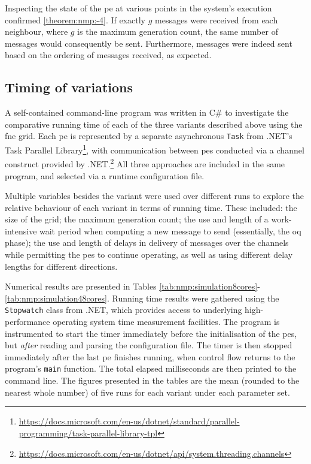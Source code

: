 Inspecting the state of the \gls{pe} at various points in the system's execution confirmed \autoref{theorem:nmp:-4}.  If exactly \(g\) messages were received from each neighbour, where \(g\) is the maximum generation count, the same number of messages would consequently be sent.  Furthermore, messages were indeed sent based on the ordering of messages received, as expected.

\subsection{\label{sec:nmp:timingexp}Timing of variations}
A self-contained command-line program was written in C\# to investigate the comparative running time of each of the three variants described above using the \gls{fne} grid.  Each \gls{pe} is represented by a separate asynchronous \texttt{Task} from .NET's Task Parallel Library{\footnote{\raggedright\url{https://docs.microsoft.com/en-us/dotnet/standard/parallel-programming/task-parallel-library-tpl}}}, with communication between \glspl{pe} conducted via a channel construct provided by .NET.\footnote{\url{https://docs.microsoft.com/en-us/dotnet/api/system.threading.channels}}  All three approaches are included in the same program, and selected via a runtime configuration file.

Multiple variables besides the variant were used over different runs to explore the relative behaviour of each variant in terms of running time.  These included:  the size of the grid; the maximum generation count;  the use and length of a work-intensive wait period when computing a new message to send (essentially, the \gls{oq} phase);  the use and length of delays in delivery of messages over the channels while permitting the \glspl{pe} to continue operating, as well as using different delay lengths for different directions.

Numerical results are presented in Tables \ref{tab:nmp:simulation8cores}-\ref{tab:nmp:simulation48cores}.  Running time results were gathered using the \texttt{Stopwatch} class from .NET, which provides access to underlying high-performance operating system time measurement facilities.  The program is instrumented to start the timer immediately before the initialisation of the \glspl{pe}, but \emph{after} reading and parsing the configuration file.  The timer is then stopped immediately after the last \gls{pe} finishes running, when control flow returns to the program's \texttt{main} function.  The total elapsed milliseconds are then printed to the command line.  The figures presented in the tables are the mean (rounded to the nearest whole number) of five runs for each variant under each parameter set.

